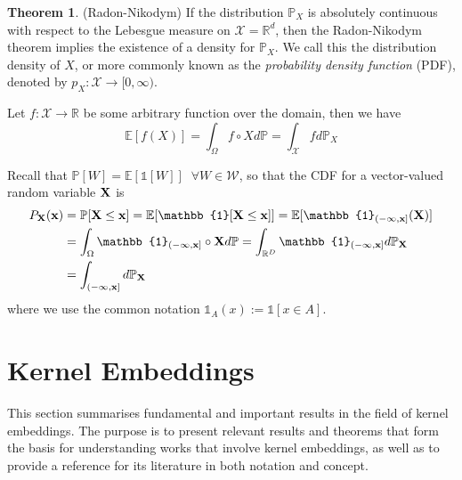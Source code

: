 \documentclass[twoside]{article} \usepackage{aistats2017}
\theoremstyle{definition}
\newtheorem{theorem}{Theorem}[section]
\newcommand{\rv}[1]{{#1}}
\begin{document}
	\begin{theorem} \label{thm:radon_nikodym}
		(Radon-Nikodym)
		If the distribution $\mathbb{P}_{\rv{X}}$ is absolutely continuous with respect to the Lebesgue measure on $\mathcal{X} = \mathbb{R}^{d}$, then the Radon-Nikodym theorem implies the existence of a density for $\mathbb{P}_{\rv{X}}$. We call this the distribution density of $\rv{X}$, or more commonly known as the \textit{probability density function} (PDF), denoted by $p_{\rv{X}}: \mathcal{X} \to [0, \infty)$.
	\end{theorem}
	
	Let $f : \mathcal{X} \to \mathbb{R}$ be some arbitrary function over the domain, then we have
	\begin{equation}
	\mathbb{E}[f(\rv{X})] = \int_{\Omega} f \circ \rv{X} d \mathbb{P} = \int_{\mathcal{X}} f d \mathbb{P}_{\rv{X}}
	\label{eq:functional_expectation}
	\end{equation}
	
	Recall that $\mathbb{P}[W] = \mathbb{E}[\mathbb{1}[W]] \;\; \forall W \in \mathcal{W}$, so that the CDF for a vector-valued random variable $\bvec{\rv{X}}$ is
	\begin{equation}
	\begin{aligned}
	P_{\bvec{\rv{X}}}(\bvec{x}) &= \mathbb{P}[\bvec{\rv{X}} \leq \bvec{x}] = \mathbb{E}[\mathbb{1}[\bvec{\rv{X}} \leq \bvec{x}]] = \mathbb{E}[\mathbb{1}_{(-\bvec{\infty}, \bvec{x}]}(\bvec{X})] \\
	&= \int_{\Omega} \mathbb{1}_{(-\bvec{\infty}, \bvec{x}]} \circ \bvec{\rv{X}} d \mathbb{P} = \int_{\mathbb{R}^{D}} \mathbb{1}_{(-\bvec{\infty}, \bvec{x}]} d \mathbb{P}_{\bvec{\rv{X}}} \\
	&= \int_{(-\bvec{\infty}, \bvec{x}]} d \mathbb{P}_{\bvec{\rv{X}}}
	\end{aligned}
	\label{eq:cdf_integral}
	\end{equation}
	where we use the common notation $\mathbb{1}_{A}(x) := \mathbb{1}[x \in A]$.
		
\section{Kernel Embeddings}
\label{sec:kernel_embeddings}
	
	This section summarises fundamental and important results in the field of kernel embeddings. The purpose is to present relevant results and theorems that form the basis for understanding works that involve kernel embeddings, as well as to provide a reference for its literature in both notation and concept. 
	
\end{document}
